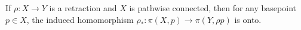 If $\rho: X \to Y$ is a retraction and $X$ is pathwise connected, then for any basepoint $p \in X$, the induced homomorphism $\rho_*: \pi(X,p) \to \pi(Y, \rho p)$ is onto.
